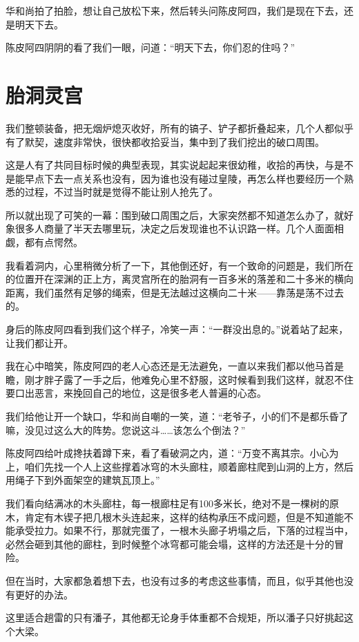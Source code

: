 华和尚拍了拍脸，想让自己放松下来，然后转头问陈皮阿四，我们是现在下去，还是明天下去。

陈皮阿四阴阴的看了我们一眼，问道：“明天下去，你们忍的住吗？”

\chapter{胎洞灵宫}

我们整顿装备，把无烟炉熄灭收好，所有的镐子、铲子都折叠起来，几个人都似乎有了默契，速度非常快，很快都收拾妥当，集中到了我们挖出的破口周围。

这是人有了共同目标时候的典型表现，其实说起起来很幼稚，收拾的再快，与是不是能早点下去一点关系也没有，因为谁也没有碰过皇陵，再怎么样也要经历一个熟悉的过程，不过当时就是觉得不能让别人抢先了。

所以就出现了可笑的一幕：围到破口周围之后，大家突然都不知道怎么办了，就好象很多人商量了半天去哪里玩，决定之后发现谁也不认识路一样。几个人面面相觑，都有点愕然。

我看着洞内，心里稍微分析了一下，其他倒还好，有一个致命的问题是，我们所在的位置开在深渊的正上方，离灵宫所在的胎洞有一百多米的落差和二十多米的横向距离，我们虽然有足够的绳索，但是无法越过这横向二十米——靠荡是荡不过去的。

身后的陈皮阿四看到我们这个样子，冷笑一声：“一群没出息的。”说着站了起来，让我们都让开。

我在心中暗笑，陈皮阿四的老人心态还是无法避免，一直以来我们都以他马首是瞻，刚才胖子露了一手之后，他难免心里不舒服，这时候看到我们这样，就忍不住要口出恶言，来挽回自己的地位，这是很多老人普遍的心态。

我们给他让开一个缺口，华和尚自嘲的一笑，道：“老爷子，小的们不是都乐昏了嘛，没见过这么大的阵势。您说这斗……该怎么个倒法？”

陈皮阿四给叶成搀扶着蹲下来，看了看破洞之内，道：“万变不离其宗。小心为上，咱们先找一个人上这些撑着冰穹的木头廊柱，顺着廊柱爬到山洞的上方，然后用绳子下到外面架空的建筑瓦顶上。”

我们看向结满冰的木头廊柱，每一根廊柱足有100多米长，绝对不是一棵树的原木，肯定有木锲子把几根木头连起来，这样的结构承压不成问题，但是不知道能不能承受拉力。如果不行，那就完蛋了，一根木头廊子坍塌之后，下落的过程当中，必然会砸到其他的廊柱，到时候整个冰穹都可能会塌，这样的方法还是十分的冒险。

但在当时，大家都急着想下去，也没有过多的考虑这些事情，而且，似乎其他也没有更好的办法。

这里适合趟雷的只有潘子，其他都无论身手体重都不合规矩，所以潘子只好挑起这个大梁。


